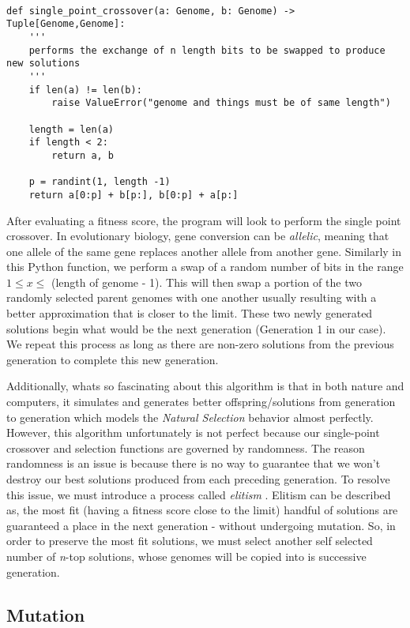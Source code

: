 \begin{lstlisting}

def single_point_crossover(a: Genome, b: Genome) -> Tuple[Genome,Genome]:   
    '''
    performs the exchange of n length bits to be swapped to produce new solutions
    '''
    if len(a) != len(b):
        raise ValueError("genome and things must be of same length")
    
    length = len(a)
    if length < 2:
        return a, b

    p = randint(1, length -1)
    return a[0:p] + b[p:], b[0:p] + a[p:]

\end{lstlisting}

After evaluating a fitness score, the program will look to perform the single point crossover. In evolutionary biology, gene conversion can be \emph{allelic}, meaning that one allele of the same gene replaces another allele from another gene. Similarly in this Python function, we perform a swap of a random number of bits in the range $1 \leq x \leq$ (length of genome - 1). This will then swap a portion of the two randomly selected parent genomes with one another usually resulting with a better approximation that is closer to the limit. These two newly generated solutions begin what would be the next generation (Generation 1 in our case). We repeat this process as long as there are non-zero solutions from the previous generation to complete this new generation.

Additionally, whats so fascinating about this algorithm is that in both nature and computers, it simulates and generates better offspring/solutions from generation to generation which models the \emph{Natural Selection} behavior almost perfectly. However, this algorithm unfortunately is not perfect because our single-point crossover and selection functions are governed by randomness. The reason randomness is an issue is because there is no way to guarantee that we won't destroy our best solutions produced from each preceding generation. To resolve this issue, we must introduce a process called \emph{elitism} \cite{Ahn}. Elitism can be described as, the most fit (having a fitness score close to the limit) handful of solutions are guaranteed a place in the next generation - without undergoing mutation. So, in order to preserve the most fit solutions, we must select another self selected number of \emph{n}-top solutions, whose genomes will be copied into is successive generation.

\subsection{Mutation}
\label{mutations}

